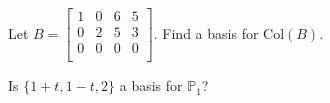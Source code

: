 \begin{enumerate}
\vfill

\Problem Let $B= \begin{bmatrix} 1 & 0 & 6 & 5\\ 0 & 2 & 5 & 3\\ 0 & 0 &0 & 0\\ \end{bmatrix}$. Find a basis for $\text{Col}(B)$.

\vfill

\Problem Is $\{1+t, 1-t,2\}$ a basis for $\mathbb{P}_1$?

\vfill



%


\end{enumerate}

